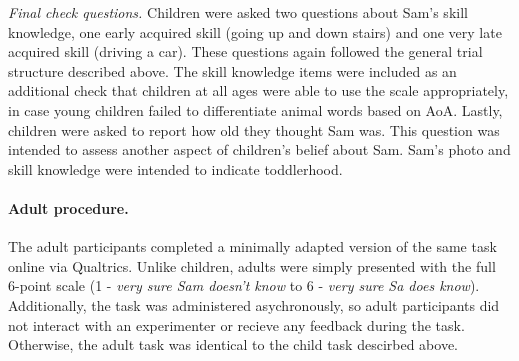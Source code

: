\documentclass[10pt, letterpaper]{article}
\begin{document}
\emph{Final check questions.} Children were asked two questions about
Sam's skill knowledge, one early acquired skill (going up and down
stairs) and one very late acquired skill (driving a car). These
questions again followed the general trial structure described above.
The skill knowledge items were included as an additional check that
children at all ages were able to use the scale appropriately, in case
young children failed to differentiate animal words based on AoA.
Lastly, children were asked to report how old they thought Sam was. This
question was intended to assess another aspect of children's belief
about Sam. Sam's photo and skill knowledge were intended to indicate
toddlerhood.

\hypertarget{adult-procedure.}{%
\paragraph{Adult procedure.}\label{adult-procedure.}}

The adult participants completed a minimally adapted version of the same
task online via Qualtrics. Unlike children, adults were simply presented
with the full 6-point scale (1 - \emph{very sure Sam doesn't know} to 6
- \emph{very sure Sa does know}). Additionally, the task was
administered asychronously, so adult participants did not interact with
an experimenter or recieve any feedback during the task. Otherwise, the
adult task was identical to the child task descirbed above.
\end{document}
